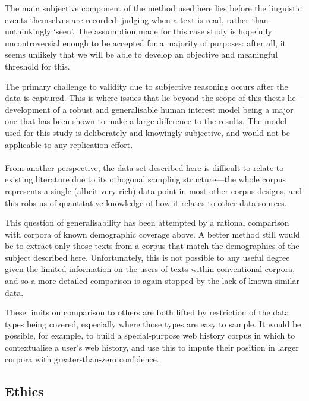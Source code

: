 The main subjective component of the method used here lies before the linguistic events themselves are recorded: judging when a text is read, rather than unthinkingly `seen'.  The assumption made for this case study is hopefully uncontroversial enough to be accepted for a majority of purposes: after all, it seems unlikely that we will be able to develop an objective and meaningful threshold for this.

The primary challenge to validity due to subjective reasoning occurs after the data is captured.  This is where issues that lie beyond the scope of this thesis lie---development of a robust and generalisable human interest model being a major one that has been shown to make a large difference to the results.  The model used for this study is deliberately and knowingly subjective, and would not be applicable to any replication effort.

\paragraph{}
From another perspective, the data set described here is difficult to relate to existing literature due to its othogonal sampling structure---the whole corpus represents a single (albeit very rich) data point in most other corpus designs, and this robs us of quantitative knowledge of how it relates to other data sources.

This question of generalisability has been attempted by a rational comparison with corpora of known demographic coverage above.  A better method still would be to extract only those texts from a corpus that match the demographics of the subject described here.  Unfortunately, this is not possible to any useful degree given the limited information on the users of texts within conventional corpora, and so a more detailed comparison is again stopped by the lack of known-similar data.

These limits on comparison to others are both lifted by restriction of the data types being covered, especially where those types are easy to sample.  It would be possible, for example, to build a special-purpose web history corpus in which to contextualise a user's web history, and use this to impute their position in larger corpora with greater-than-zero confidence.






\subsection{Ethics}
\label{sec:personal:discussion:ethics}




